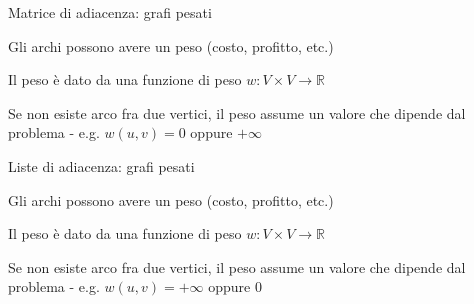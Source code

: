 \begin{frame}{Matrice di adiacenza: grafi pesati}

\vspace{-9pt}
\begin{myboxtitle}
\BI
\item Gli archi possono avere un \alert{peso} (costo, profitto, etc.)
\item Il peso è dato da una funzione di peso \alert{$w: V \times V \rightarrow \mathbb{R}$}
\item Se non esiste arco fra due vertici, il peso assume un valore che dipende dal problema - e.g. $w(u,v) = 0$ oppure $+\infty$
\EI
\end{myboxtitle}

\vspace{-9pt}

\end{frame}

\begin{frame}{Liste di adiacenza: grafi pesati}

\vspace{-9pt}
\begin{myboxtitle}
\BI
\item Gli archi possono avere un \alert{peso} (costo, profitto, etc.)
\item Il peso è dato da una funzione di peso \alert{$w: V \times V \rightarrow \mathbb{R}$}
\item Se non esiste arco fra due vertici, il peso assume un valore che dipende dal problema - e.g. $w(u,v) = +\infty$ oppure $0$
\EI
\end{myboxtitle}

\vspace{-9pt}

\end{frame}

